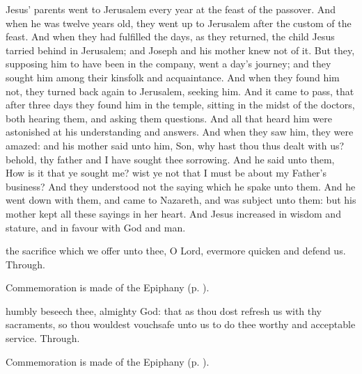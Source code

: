 
 Jesus' parents went to Jerusalem every year at the feast of the passover. And when he was twelve years old, they went up to Jerusalem after the custom of the feast. And when they had fulfilled the days, as they returned, the child Jesus tarried behind in Jerusalem; and Joseph and his mother knew not of it. But they, supposing him to have been in the company, went a day's journey; and they sought him among their kinsfolk and acquaintance. And when they found him not, they turned back again to Jerusalem, seeking him. And it came to pass, that after three days they found him in the temple, sitting in the midst of the doctors, both hearing them, and asking them questions. And all that heard him were astonished at his understanding and answers. And when they saw him, they were amazed: and his mother said unto him, Son, why hast thou thus dealt with us? behold, thy father and I have sought thee sorrowing. And he said unto them, How is it that ye sought me? wist ye not that I must be about my Father's business? And they understood not the saying which he spake unto them. And he went down with them, and came to Nazareth, and was subject unto them: but his mother kept all these sayings in her heart. And Jesus increased in wisdom and stature, and in favour with God and man.

\secret
{} the sacrifice which we offer unto thee, O Lord, evermore quicken and defend us. Through.
\begin{rubric}
    Commemoration is made of the Epiphany (p. \pageref{EpiphanyMassSecret}).
\end{rubric}
\postcommunion
{} humbly beseech thee, almighty God: that as thou dost refresh us with thy sacraments, so thou wouldest vouchsafe unto us to do thee worthy and acceptable service. Through.
\begin{rubric}
    Commemoration is made of the Epiphany (p. \pageref{EpiphanyMassPostcommunion}).
\end{rubric}

